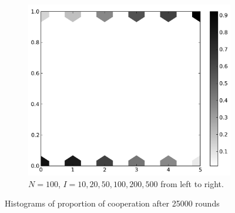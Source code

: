 \documentclass{amsart}
\begin{document}
\begin{figure}[h!tbp]
\begin{subfigure}{.3\linewidth}
    \label{fig:pop20iter}
  \end{subfigure}
  \hspace{.01\linewidth}
  \begin{subfigure}{.3\linewidth}
    \centering
    \includegraphics[width=\linewidth]{pop100iter.png}
    \caption{$N=100$,  $I = 10,20,50,100,200,500$ from left to
      right.}
    \label{fig:pop100iter}
  \end{subfigure}
  \caption{Histograms of proportion of cooperation after 25000 rounds}
\end{figure}
\end{document}
